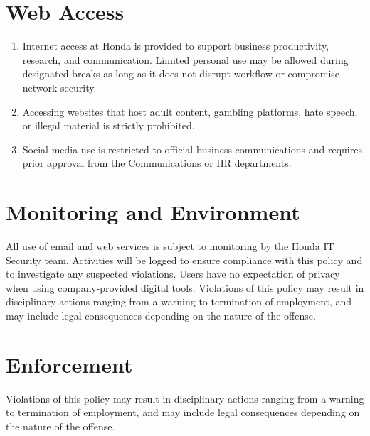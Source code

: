 \section{Web Access}

\begin{enumerate}
    \item \textbf{}Internet access at Honda is provided to support business productivity, research, and communication. Limited personal use may be allowed during designated breaks as long as it does not disrupt workflow or compromise network security.

    \item \textbf{}Accessing websites that host adult content, gambling platforms, hate speech, or illegal material is strictly prohibited.

    \item \textbf{}Social media use is restricted to official business communications and requires prior approval from the Communications or HR departments.
    
\end{enumerate}

\section{Monitoring and Environment}

All use of email and web services is subject to monitoring by the Honda IT Security team. Activities will be logged to ensure compliance with this policy and to investigate any suspected violations. Users have no expectation of privacy when using company-provided digital tools. Violations of this policy may result in disciplinary actions ranging from a warning to termination of employment, and may include legal consequences depending on the nature of the offense.

\section{Enforcement}
Violations of this policy may result in disciplinary actions ranging from a warning to termination of employment, and may include legal consequences depending on the nature of the offense.

